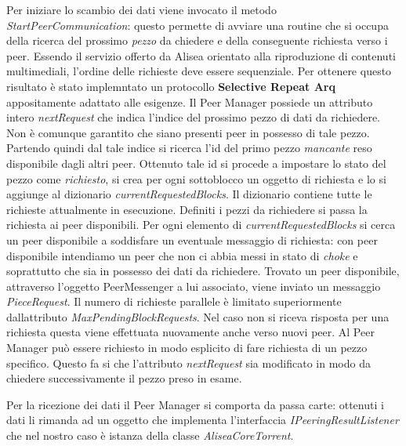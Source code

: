 \documentclass[a4]{book}
\begin{document}
Per iniziare lo scambio dei dati viene invocato il metodo \textit{StartPeerCommunication}: questo permette di avviare una routine che si occupa della ricerca del prossimo \textit{pezzo} da chiedere e della conseguente richiesta verso i peer.\newline
Essendo il servizio offerto da Alisea orientato alla riproduzione di contenuti multimediali, l'ordine delle richieste deve essere sequenziale. Per ottenere questo risultato è stato implemntato un protocollo \textbf{Selective Repeat Arq} appositamente adattato alle esigenze.\newline
Il Peer Manager possiede un attributo intero \textit{nextRequest} che indica l'indice del prossimo pezzo di dati da richiedere. Non è comunque garantito che siano presenti peer in possesso di tale pezzo. Partendo quindi dal tale indice si ricerca l'id del primo pezzo \textit{mancante} reso disponibile dagli altri peer.\newline
Ottenuto tale id si procede a impostare lo stato del pezzo come \textit{richiesto}, si crea per ogni sottoblocco un oggetto di richiesta e lo si aggiunge al dizionario \textit{currentRequestedBlocks}. Il dizionario contiene tutte le richieste attualmente in esecuzione.\newline
Definiti i pezzi da richiedere si passa la richiesta ai peer disponibili. Per ogni elemento di \textit{currentRequestedBlocks} si cerca un peer disponibile a soddisfare un eventuale messaggio di richiesta: con peer disponibile intendiamo un peer che non ci abbia messi in stato di \textit{choke} e soprattutto che sia in possesso dei dati da richiedere.\newline
Trovato un peer disponibile, attraverso l'oggetto PeerMessenger a lui associato, viene inviato un messaggio \textit{PieceRequest}.\newline
Il numero di richieste parallele è limitato superiormente dallattributo \textit{MaxPendingBlockRequests}. Nel caso non si riceva risposta per una richiesta questa viene effettuata nuovamente anche verso nuovi peer.\newline
Al Peer Manager può essere richiesto in modo esplicito di fare richiesta di un pezzo specifico. Questo fa si che l'attributo \textit{nextRequest} sia modificato in modo da chiedere successivamente il pezzo preso in esame.\newline

Per la ricezione dei dati il Peer Manager si comporta da passa carte: ottenuti i dati li rimanda ad un oggetto che implementa l'interfaccia \textit{IPeeringResultListener} che nel nostro caso è istanza della classe \textit{AliseaCoreTorrent}.\newline
\end{document}
